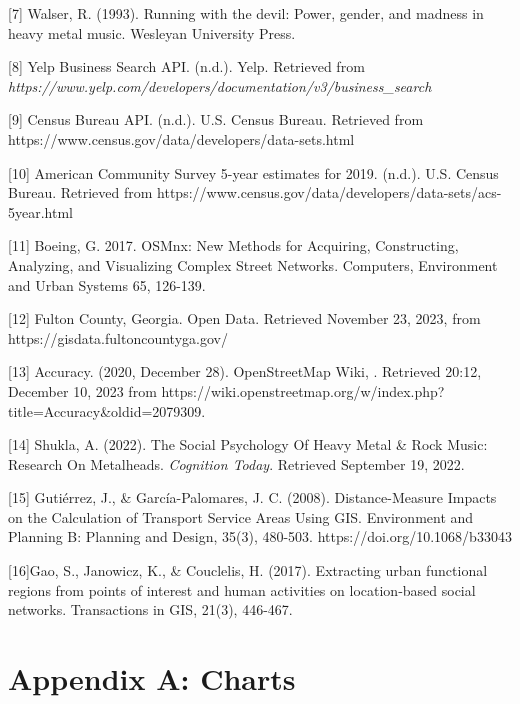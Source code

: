 \documentclass[11pt]{article}
\begin{document}
{[}7{]} Walser, R. (1993). Running with the devil: Power, gender, and madness in heavy metal music. Wesleyan University Press.

{[}8{]} Yelp Business Search API. (n.d.). Yelp. Retrieved from \textit{https://www.yelp.com/developers/documentation/v3/business\_search}

{[}9{]} Census Bureau API. (n.d.). U.S. Census Bureau. Retrieved from https://www.census.gov/data/developers/data-sets.html

{[}10{]} American Community Survey 5-year estimates for 2019. (n.d.). U.S. Census Bureau. Retrieved from https://www.census.gov/data/developers/data-sets/acs-5year.html

{[}11{]} Boeing, G. 2017. OSMnx: New Methods for Acquiring, Constructing, Analyzing, and Visualizing Complex Street Networks. Computers, Environment and Urban Systems 65, 126-139.

{[}12{]} Fulton County, Georgia. Open Data. Retrieved November 23, 2023, from https://gisdata.fultoncountyga.gov/

{[}13{]} Accuracy. (2020, December 28). OpenStreetMap Wiki, . Retrieved 20:12, December 10, 2023 from https://wiki.openstreetmap.org/w/index.php?title=Accuracy\&oldid=2079309.

{[}14{]} Shukla, A. (2022). The Social Psychology Of Heavy Metal \& Rock Music: Research On Metalheads. \textit{Cognition Today}. Retrieved September 19, 2022.

{[}15{]} Gutiérrez, J., \& García-Palomares, J. C. (2008). Distance-Measure Impacts on the Calculation of Transport Service Areas Using GIS. Environment and Planning B: Planning and Design, 35(3), 480-503. https://doi.org/10.1068/b33043

{[}16{]}Gao, S., Janowicz, K., \& Couclelis, H. (2017). Extracting urban functional regions from points of interest and human activities on location‐based social networks. Transactions in GIS, 21(3), 446-467.














\newpage

\appendix
\section{Appendix A: Charts}
\end{document}
